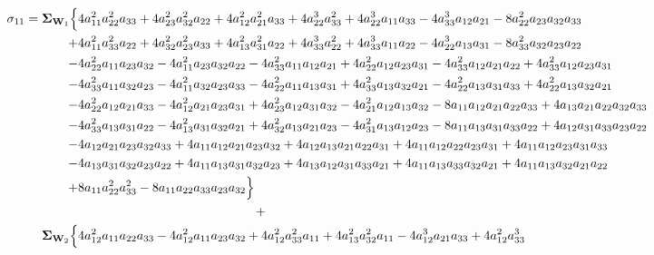 \documentclass{article}
\begin{document}
\begin{equation}
\begin{aligned}
 \sigma_{11} =  \mathbf{\Sigma}_{\textbf{W}_{1}} \Bigl\{ & 4 a_{11}^{2} a_{22}^{2} a_{33} + 4 a_{23}^{2} a_{32}^{2} a_{22} + 4 a_{12}^{2} a_{21}^{2} a_{33} + 4 a_{22}^{3} a_{33}^{2} + 4 a_{22}^{3} a_{11} a_{33} - 4 a_{33}^{3} a_{12} a_{21} - 8 a_{22}^{2} a_{23} a_{32} a_{33} \\
+ & 4 a_{11}^{2} a_{33}^{2} a_{22} + 4 a_{32}^{2} a_{23}^{2} a_{33} + 4 a_{13}^{2} a_{31}^{2} a_{22} + 4 a_{33}^{3} a_{22}^{2} + 4 a_{33}^{3} a_{11} a_{22} - 4 a_{22}^{3} a_{13} a_{31} - 8 a_{33}^{2} a_{32} a_{23} a_{22} \\
-& 4 a_{22}^{2} a_{11} a_{23} a_{32} - 4 a_{11}^{2} a_{23} a_{32} a_{22} - 4 a_{33}^{2} a_{11} a_{12} a_{21} + 4 a_{22}^{2} a_{12} a_{23} a_{31} - 4 a_{33}^{2} a_{12} a_{21} a_{22} + 4 a_{33}^{2} a_{12} a_{23} a_{31} \\
-& 4 a_{33}^{2} a_{11} a_{32} a_{23} - 4 a_{11}^{2} a_{32} a_{23} a_{33} - 4 a_{22}^{2} a_{11} a_{13} a_{31} + 4 a_{33}^{2} a_{13} a_{32} a_{21} - 4 a_{22}^{2} a_{13} a_{31} a_{33} + 4 a_{22}^{2} a_{13} a_{32} a_{21} \\
-& 4 a_{22}^{2} a_{12} a_{21} a_{33} - 4 a_{12}^{2} a_{21} a_{23} a_{31} + 4 a_{23}^{2} a_{12} a_{31} a_{32} - 4 a_{21}^{2} a_{12} a_{13} a_{32} - 8 a_{11} a_{12} a_{21} a_{22} a_{33} + 4 a_{13} a_{21} a_{22} a_{32} a_{33} \\
-& 4 a_{33}^{2} a_{13} a_{31} a_{22} - 4 a_{13}^{2} a_{31} a_{32} a_{21} + 4 a_{32}^{2} a_{13} a_{21} a_{23} - 4 a_{31}^{2} a_{13} a_{12} a_{23} - 8 a_{11} a_{13} a_{31} a_{33} a_{22} + 4 a_{12} a_{31} a_{33} a_{23} a_{22} \\
- & 4 a_{12} a_{21} a_{23} a_{32} a_{33} + 4 a_{11} a_{12} a_{21} a_{23} a_{32} + 4 a_{12} a_{13} a_{21} a_{22} a_{31} + 4 a_{11} a_{12} a_{22} a_{23} a_{31} + 4 a_{11} a_{12} a_{23} a_{31} a_{33} \\
-& 4 a_{13} a_{31} a_{32} a_{23} a_{22} + 4 a_{11} a_{13} a_{31} a_{32} a_{23} + 4 a_{13} a_{12} a_{31} a_{33} a_{21} + 4 a_{11} a_{13} a_{33} a_{32} a_{21} + 4 a_{11} a_{13} a_{32} a_{21} a_{22} \\
+& 8 a_{11} a_{22}^{2} a_{33}^{2} - 8 a_{11} a_{22} a_{33} a_{23} a_{32}\Bigr\} \\
& \qquad \qquad \qquad \qquad \qquad \qquad \qquad + \\
 \mathbf{\Sigma}_{\textbf{W}_{2}} \Bigl\{&4 a_{12}^{2} a_{11} a_{22} a_{33} - 4 a_{12}^{2} a_{11} a_{23} a_{32} + 4 a_{12}^{2} a_{33}^{2} a_{11} + 4 a_{13}^{2} a_{32}^{2} a_{11} - 4 a_{12}^{3} a_{21} a_{33} + 4 a_{12}^{2} a_{33}^{3} \\

\end{aligned}
\end{equation}
\end{document}
